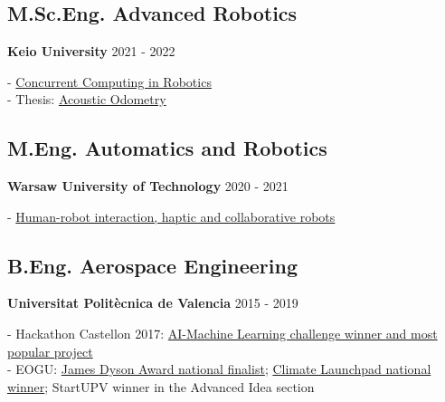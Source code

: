 \section*{\faInstitution} \label{sec:education}
 {}

\subsection{M.Sc.Eng. Advanced Robotics}

\textbf{Keio University} \hfill 
{\footnotesize 2021 - 2022} \\
{
\raggedright
-
\href{https://www.linkedin.com/in/andreu-gimenez/overlay/education/733808829/multiple-media-viewer/?treasuryMediaId=1635488056423}{Concurrent
    Computing in Robotics} \\
- Thesis: \href{https://github.com/AcousticOdometry/AO}{Acoustic Odometry}
\\
}

\subsection{M.Eng. Automatics and Robotics}

\textbf{Warsaw University of Technology} \hfill 
{\footnotesize 2020 - 2021} \\
{
\raggedright
-
\href{https://www.linkedin.com/in/andreu-gimenez/overlay/education/674981675/multiple-media-viewer/?treasuryMediaId=1635461293122}{Human-robot
    interaction, haptic and collaborative robots} \\
}

\subsection{B.Eng. Aerospace Engineering}

\textbf{Universitat Politècnica de Valencia} \hfill 
{\footnotesize 2015 - 2019} \\
{
\raggedright
- Hackathon Castellon 2017:
\href{https://www.upv.es/rtv/tv/actualidad-en-la-upv/59131}{AI-Machine
    Learning challenge winner and most popular project} \\
- EOGU: \href{https://www.jamesdysonaward.org/2018/project/eogu/}{James
    Dyson Award national finalist};
\href{http://www.upv.es/noticias-upv/noticia-10449-climatelaunchp-es.html}{Climate
    Launchpad national winner}; StartUPV winner in the Advanced Idea section
\\
}

